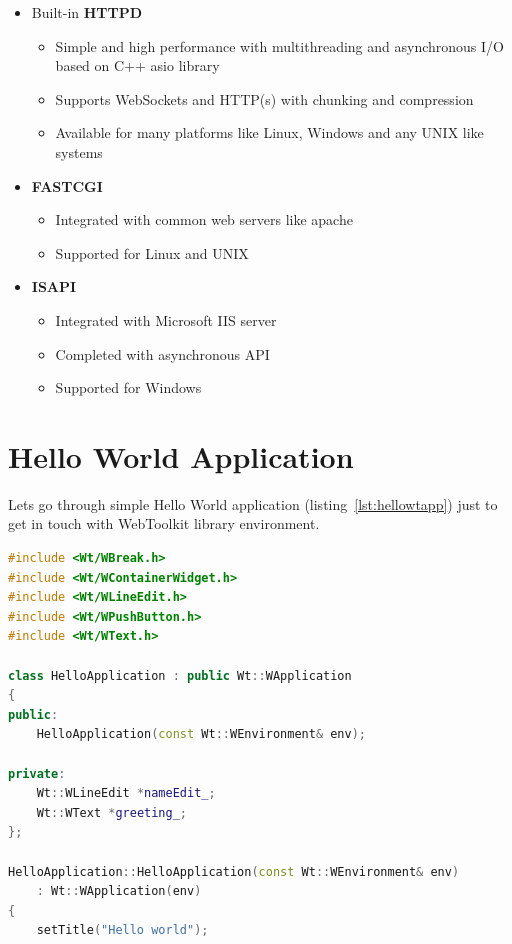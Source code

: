 \documentclass[a4paper,12pt]{book}
\begin{document}
{{{\begin{itemize}
	\item Built-in \textbf{HTTPD}
	\begin{itemize}
     \item Simple and high performance with multithreading and asynchronous I/O based on C++ asio library
     \item Supports WebSockets and HTTP(s) with chunking and compression
     \item Available for many platforms like Linux, Windows and any UNIX like systems
     \end{itemize}
	\item \textbf{FASTCGI}
	\begin{itemize}
     \item Integrated with common web servers like apache
     \item Supported for Linux and UNIX
     \end{itemize}
	\item \textbf{ISAPI}
	\begin{itemize}
     \item Integrated with Microsoft IIS server
     \item Completed with asynchronous API
     \item Supported for Windows
     \end{itemize}
\end{itemize}
}
\newpage
}

\section{Hello World Application}
{
Lets go through simple Hello World application (listing~\ref{lst:hellowtapp}) just to get in touch with WebToolkit library environment.

\begin{lstlisting}[frame=single, label={lst:hellowtapp}, basicstyle=\small, language=C++, caption={A complete "Hello world" application \cite{helloworldapp}.}, captionpos=b]
#include <Wt/WBreak.h>
#include <Wt/WContainerWidget.h>
#include <Wt/WLineEdit.h>
#include <Wt/WPushButton.h>
#include <Wt/WText.h>

class HelloApplication : public Wt::WApplication
{
public:
    HelloApplication(const Wt::WEnvironment& env);

private:
    Wt::WLineEdit *nameEdit_;
    Wt::WText *greeting_;
};

HelloApplication::HelloApplication(const Wt::WEnvironment& env)
    : Wt::WApplication(env)
{
    setTitle("Hello world");


\end{lstlisting}}}
\end{document}
